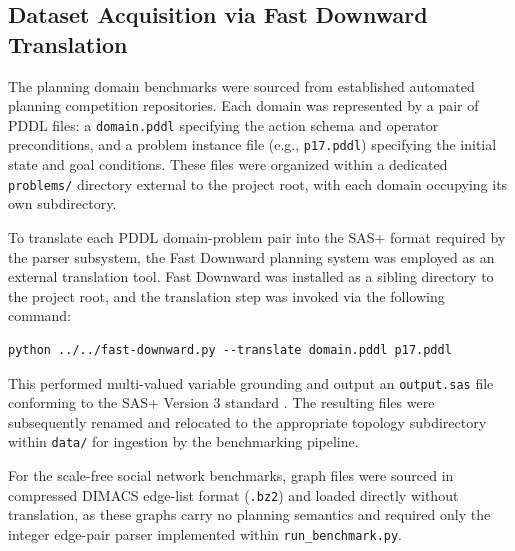 \subsection{Dataset Acquisition via Fast Downward Translation}
\label{subsec:dataset_acquisition}
The planning domain benchmarks were sourced from established automated planning competition repositories. Each domain was represented by a pair of PDDL files: a \texttt{domain.pddl} specifying the action schema and operator preconditions, and a problem instance file (e.g., \texttt{p17.pddl}) specifying the initial state and goal conditions. These files were organized within a dedicated \texttt{problems/} directory external to the project root, with each domain occupying its own subdirectory.

To translate each PDDL domain-problem pair into the SAS+ format required by the parser subsystem, the Fast Downward planning system \cite{fastdownward} was employed as an external translation tool. Fast Downward was installed as a sibling directory to the project root, and the translation step was invoked via the following command:

\begin{lstlisting}[caption={Fast Downward SAS+ translation command.}, label={lst:fd}]
python ../../fast-downward.py --translate domain.pddl p17.pddl
\end{lstlisting}

This performed multi-valued variable grounding and output an \texttt{output.sas} file conforming to the SAS+ Version 3 standard \cite{sasdocs}. The resulting files were subsequently renamed and relocated to the appropriate topology subdirectory within \texttt{data/} for ingestion by the benchmarking pipeline.

For the scale-free social network benchmarks, graph files were sourced in compressed DIMACS edge-list format (\texttt{.bz2}) and loaded directly without translation, as these graphs carry no planning semantics and required only the integer edge-pair parser implemented within \texttt{run\_benchmark.py}.


